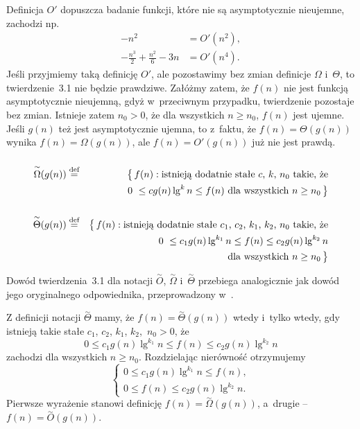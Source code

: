\subsubsection{} %
Definicja $O'$ dopuszcza badanie funkcji, które nie są asymptotycznie nieujemne, zachodzi np.
\begin{align*}
	-n^2 &= O'(n^2), \\
	-\frac{n^3}{2}+\frac{n^2}{6}-3n &= O'(n^4).
\end{align*}
Jeśli przyjmiemy taką definicję $O'$, ale pozostawimy bez zmian definicje $\Omega$ i~$\Theta$, to twierdzenie~3.1 nie będzie prawdziwe. Załóżmy zatem, że $f(n)$ nie jest funkcją asymptotycznie nieujemną, gdyż w~przeciwnym przypadku, twierdzenie pozostaje bez zmian. Istnieje zatem $n_0>0$, że dla wszystkich $n\ge n_0$, $f(n)$ jest ujemne. Jeśli $g(n)$ też jest asymptotycznie ujemna, to z~faktu, że $f(n)=\Theta(g(n))$ wynika $f(n)=\Omega(g(n))$, ale $f(n)=O'(g(n))$ już nie jest prawdą.

\subsubsection{} %
\begin{eqnarray*}
	\overset{\sim}{\Omega}(g(n)) &\stackrel{\text{\scriptsize def}}{=}& \bigl\{\,f(n):\text{istnieją dodatnie stałe $c$,~$k$,~$n_0$ takie, że} \\
	&& \quad 0~\le cg(n)\lg^kn \le \text{$f(n)$ dla wszystkich $n \ge n_0$}\,\bigr\} \\\\
	\overset{\sim}{\Theta}(g(n)) &\stackrel{\text{\scriptsize def}}{=}& \bigl\{\,f(n):\text{istnieją dodatnie stałe $c_1$,~$c_2$,~$k_1$,~$k_2$,~$n_0$ takie, że} \\
	&& \quad 0~\le c_1g(n)\lg^{k_1}n \le f(n) \le c_2g(n)\lg^{k_2}n \\
	&& \quad\text{dla wszystkich $n \ge n_0$}\,\bigr\}
\end{eqnarray*}

Dowód twierdzenia~3.1 dla notacji $\overset{\sim}{O}$, $\overset{\sim}{\Omega}$ i~$\overset{\sim}{\Theta}$ przebiega analogicznie jak dowód jego oryginalnego odpowiednika, przeprowadzony w~.

Z definicji notacji $\overset{\sim}{\Theta}$ mamy, że $f(n)=\overset{\sim}{\Theta}(g(n))$ wtedy i~tylko wtedy, gdy istnieją takie stałe $c_1$, $c_2$, $k_1$, $k_2$,~$n_0>0$, że
\[
	0 \le c_1g(n)\lg^{k_1}n \le f(n) \le c_2g(n)\lg^{k_2}n
\]
zachodzi dla wszystkich $n\ge n_0$. Rozdzielając nierówność otrzymujemy
\[
	\begin{cases}
		0 \le c_1g(n)\lg^{k_1}n \le f(n), \\
		0 \le f(n) \le c_2g(n)\lg^{k_2}n.
	\end{cases}
\]
Pierwsze wyrażenie stanowi definicję $f(n)=\overset{\sim}{\Omega}(g(n))$, a~drugie -- $f(n)=\overset{\sim}{O}(g(n))$.

